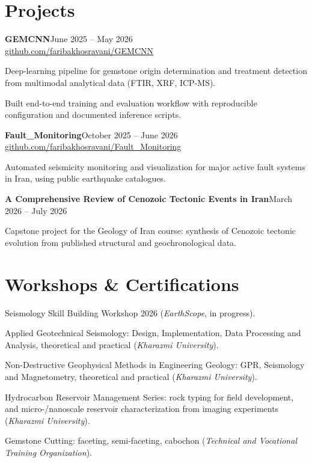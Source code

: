 \documentclass[11pt]{article}
\begin{document}
\section*{Projects}
\textbf{GEMCNN}\hfill June 2025 -- May 2026\\
\href{https://github.com/faribakhosravani/GEMCNN}{github.com/faribakhosravani/GEMCNN}
\begin{cvitems}
  \item Deep-learning pipeline for gemstone origin determination and treatment detection from
        multimodal analytical data (FTIR, XRF, ICP-MS).
  \item Built end-to-end training and evaluation workflow with reproducible configuration and
        documented inference scripts.
\end{cvitems}

\vspace{4pt}
\textbf{Fault\_Monitoring}\hfill October 2025 -- June 2026\\
\href{https://github.com/faribakhosravani/Fault_Monitoring}{github.com/faribakhosravani/Fault\_Monitoring}
\begin{cvitems}
  \item Automated seismicity monitoring and visualization for major active fault systems in Iran,
        using public earthquake catalogues.
\end{cvitems}

\vspace{4pt}
\textbf{A Comprehensive Review of Cenozoic Tectonic Events in Iran}\hfill March 2026 -- July 2026
\begin{cvitems}
  \item Capstone project for the Geology of Iran course: synthesis of Cenozoic tectonic
        evolution from published structural and geochronological data.
\end{cvitems}

\section*{Workshops \& Certifications}
\begin{cvitems}
  \item Seismology Skill Building Workshop 2026 (\textit{EarthScope}, in progress).
  \item Applied Geotechnical Seismology: Design, Implementation, Data Processing and Analysis,
        theoretical and practical (\textit{Kharazmi University}).
  \item Non-Destructive Geophysical Methods in Engineering Geology: GPR, Seismology and
        Magnetometry, theoretical and practical (\textit{Kharazmi University}).
  \item Hydrocarbon Reservoir Management Series: rock typing for field development, and
        micro-/nanoscale reservoir characterization from imaging experiments
        (\textit{Kharazmi University}).
  \item Gemstone Cutting: faceting, semi-faceting, cabochon
        (\textit{Technical and Vocational Training Organization}).
\end{cvitems}
\end{document}
